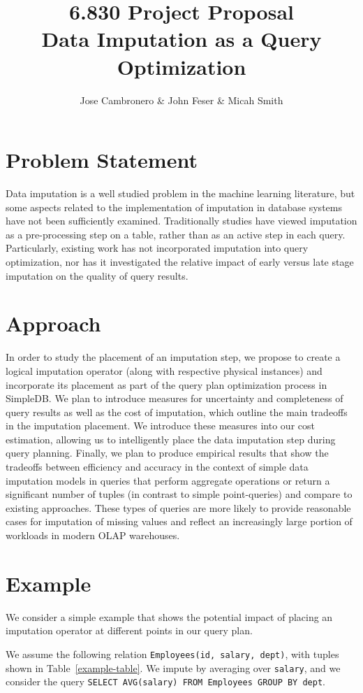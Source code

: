 \documentclass{article}
\title{6.830 Project Proposal \\
  \large Data Imputation as a Query Optimization}
\author{Jose Cambronero \& John Feser \& Micah Smith}
\begin{document}
\maketitle

\section{Problem Statement}
Data imputation is a well studied problem in the machine learning literature, but some aspects related to the implementation of imputation in database systems have not been sufficiently examined. Traditionally studies have viewed imputation as a pre-processing step on a table, rather than as an active step in each query. Particularly, existing work has not incorporated imputation into query optimization, nor has it investigated the relative impact of early versus late stage imputation on the quality of query results.

\section{Approach}
In order to study the placement of an imputation step, we propose to create a logical imputation operator (along with respective physical instances) and incorporate its placement as part of the query plan optimization process in SimpleDB.  We plan to introduce measures for uncertainty and completeness of query results as well as the cost of imputation, which outline the main tradeoffs in the imputation placement. We introduce these measures into our cost estimation, allowing us to intelligently place the data imputation step during query planning. Finally, we plan to produce empirical results that show the tradeoffs between efficiency and accuracy in the context of simple data imputation models in queries that perform aggregate operations or return a significant number of tuples (in contrast to simple point-queries) and compare to existing approaches.  These types of queries are more likely to provide reasonable cases for imputation of missing values and reflect an increasingly large portion of workloads in modern OLAP warehouses.

\section{Example}
We consider a simple example that shows the potential impact of placing an imputation operator at different points in our query plan.

We assume the following relation \lstinline{Employees(id, salary, dept)}, with tuples shown in Table~\ref{example-table}. We impute by averaging over \lstinline{salary}, and we consider the query \lstinline{SELECT AVG(salary) FROM Employees GROUP BY dept}.
\end{document}
